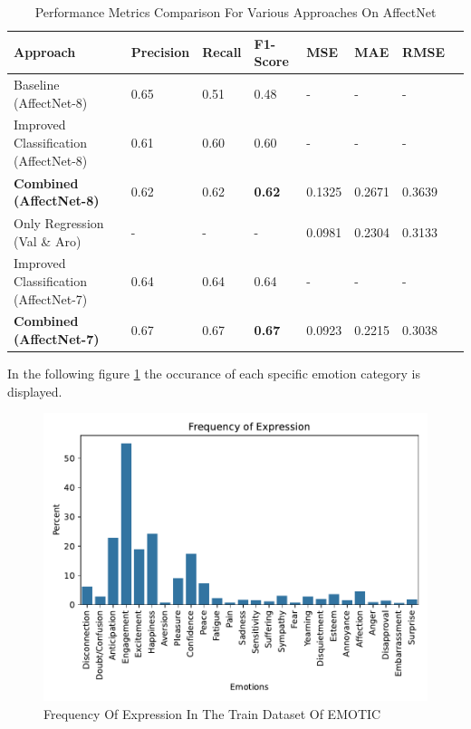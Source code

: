 \documentclass[conference]{IEEEtran}
\begin{document}
\begin{table}
\caption{Performance Metrics Comparison For Various Approaches On AffectNet}
\label{tab:metrics}
\begin{tabularx}{\textwidth}{@{} l *{6}{C} c @{}}
\toprule
\textbf{Approach}
& \textbf{Precision} & \textbf{Recall} & \textbf{F1-Score} & \textbf{MSE} & \textbf{MAE} & \textbf{RMSE}
\\ 
\midrule
Baseline (AffectNet-8) & 0.65 & 0.51 & 0.48 & -& -& - \\
Improved Classification (AffectNet-8) & 0.61 & 0.60 & 0.60 & - & - & - \\
\textbf{Combined (AffectNet-8)} & 0.62 & 0.62 & \textbf{0.62} & 0.1325 & 0.2671 & 0.3639  \\
\addlinespace

Only Regression (Val \& Aro) & - & - & - & 0.0981& 0.2304& 0.3133 \\
\addlinespace

Improved Classification (AffectNet-7) & 0.64 & 0.64 & 0.64 & - & - & - \\
\textbf{Combined (AffectNet-7)} & 0.67 & 0.67 & \textbf{0.67} & 0.0923 & 0.2215 & 0.3038 \\
\bottomrule
\end{tabularx}
\end{table}

In the following figure \ref{fig:emotic_labeldistr} the occurance of each specific emotion category is displayed. 

\begin{figure}[h]
    \centering
    \includegraphics[width=0.85\columnwidth]{pictures/emotic/frequency_of_expression.pdf}
    \caption{Frequency Of Expression In The Train Dataset Of EMOTIC}
    \label{fig:emotic_labeldistr}
\end{figure}
\end{document}
